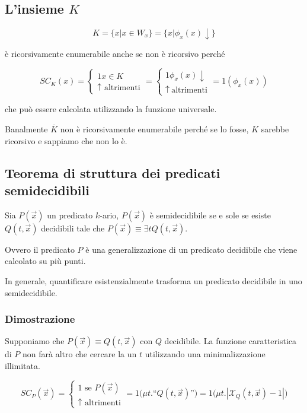 
\subsection{L'insieme $K$}

$$ 
K= \{x | x \in W_x \} = \{ x | \phi_x(x) \downarrow \}
$$

è ricorsivamente enumerabile anche se non è ricorsivo perché 

$$
SC_K(x) = \begin{cases}
1 x \in K \\
\uparrow \text{ altrimenti}
\end{cases} = \begin{cases}
1 \phi_x(x)\downarrow \\
\uparrow \: \text{altrimenti}
\end{cases} = 1(\phi_x(x))
$$

che può essere calcolata utilizzando la funzione universale.

Banalmente $\overline{K}$ non è ricorsivamente enumerabile perché se lo fosse, $K$ sarebbe ricorsivo e sappiamo che non lo è.

\subsection{Teorema di struttura dei predicati semidecidibili}

Sia $P(\vec{x})$ un predicato $k$-ario, $P(\vec{x})$ è semidecidibile se e sole se esiste $Q(t,\vec{x})$ decidibili tale che $P(\vec{x}) \equiv \exists t Q(t,\vec{x})$.

Ovvero il predicato $P$ è una generalizzazione di un predicato decidibile che viene calcolato su più punti.

In generale, quantificare esistenzialmente trasforma un predicato decidibile in uno semidecidibile.

\subsubsection{Dimostrazione}

Supponiamo che $P(\vec{x}) \equiv Q(t,\vec{x})$ con $Q$ decidibile. La funzione caratteristica di $P$ non farà altro che cercare la un $t$ utilizzando una minimalizzazione illimitata.

$$
SC_P(\vec{x}) = \begin{cases}
1 \text{ se } P(\vec{x}) \\
\uparrow \text{ altrimenti} 
\end{cases} = 1 \big(\mu t. \text{``}Q(t,\vec{x})\text{''} \big) = 1\big( \mu t . |\mathcal{X}_Q(t,\vec{x})  - 1| \big)
$$

